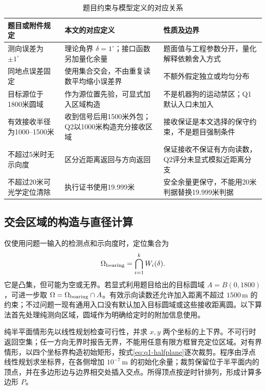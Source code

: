 \begin{table}[htbp]
 \centering\small
 \caption{题目约束与模型定义的对应关系}
 \label{tab:q1-rule-correspondence}
 \begin{tabularx}{\textwidth}{@{}>{\raggedright\arraybackslash}p{}L L@{}}
  \toprule
  题目或附件规定 & 本文的对应定义 & 性质及边界 \\
  \midrule
  测向误差为 $\pm1^\circ$ & 理论角界 $\delta=1^\circ$；接口函数另加量化余量 & 题面值与工程参数分开，量化解释依赖舍入方式 \\
  同地点误差固定 & 使用集合交会，不由重复读数平均缩小误差界 & 不额外假定独立或均匀分布 \\
  目标源位于1800米圆域 & 作为源位置先验，可显式加入区域构造 & 不是机器狗的运动禁区；Q1默认入口未加入 \\
  有效接收半径为1000--1500米 & 收到信号后用1500米外包；Q2以1000米构造充分接收区域 & 接收保证是本文选择的保守约束，不是题目强制条件 \\
  不超过5米时无示向度 & 区分近距离返回与方向返回 & 保证接收不保证有方向读数，Q2评分未显式模拟近距离分支 \\
  不超过20米可光学定位清除 & 执行证书使用19.999米 & 安全余量更保守，不能用20米判据替换19.999米判据 \\
  \bottomrule
 \end{tabularx}
\end{table}

\subsection{交会区域的构造与直径计算}
仅使用问题一输入的检测点和示向度时，定位集合为
\begin{equation}
 \Omega_{\rm bearing}=\bigcap_{i=1}^{k}W_i(\delta).
 \label{eq:q1-domain}
\end{equation}
它是凸集，但可能为空或无界。若显式利用题目给出的目标圆域 $A=B(0,1800)$，可进一步取 $\Omega=\Omega_{\rm bearing}\cap A$。有效示向读数还允许加入距离不超过 $1500\,\mathrm m$ 的约束；不过问题一现有通用入口没有默认加入目标圆域或这些接收距离圆。以下算法首先处理纯测向区域，圆域作为明确给定时的附加信息使用。

纯半平面情形先以线性规划检查可行性，并求 $x,y$ 两个坐标的上下界。不可行时返回空集；任一方向无界时报告无界，不能用任意有限方框冒充定位区域。对有界情形，以四个坐标界构造初始矩形，按式\eqref{eq:q1-halfplane}逐次裁剪。程序由浮点线性规划求坐标界，在各侧增加 $10^{-7}\,\mathrm m$ 的初始化余量；裁剪保留位于半平面内的顶点，并在多边形边与边界相交处插入交点。所得顶点按逆时针排列，形成计算多边形 $P$。

